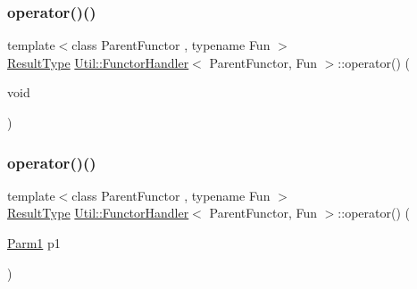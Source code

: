 \mbox{\label{classUtil_1_1FunctorHandler_a568e55043d17f0034572b4ad2772391e}} 
\subsubsection{\texorpdfstring{operator()()}{operator()()}\hspace{0.1cm}{\footnotesize\ttfamily [2/12]}}
{\footnotesize\ttfamily template$<$class Parent\+Functor , typename Fun $>$ \\
\mbox{\hyperlink{classUtil_1_1FunctorHandler_a036da44b8cc2567704cebd2a20d16c80}{Result\+Type}} \mbox{\hyperlink{classUtil_1_1FunctorHandler}{Util\+::\+Functor\+Handler}}$<$ Parent\+Functor, Fun $>$\+::operator() (\begin{DoxyParamCaption}\item[{void}]{ }\end{DoxyParamCaption})\hspace{0.3cm}{\ttfamily [inline]}}

\mbox{\label{classUtil_1_1FunctorHandler_a38485a110bfa7b2fdb5e34553d2f7264}} 
\subsubsection{\texorpdfstring{operator()()}{operator()()}\hspace{0.1cm}{\footnotesize\ttfamily [3/12]}}
{\footnotesize\ttfamily template$<$class Parent\+Functor , typename Fun $>$ \\
\mbox{\hyperlink{classUtil_1_1FunctorHandler_a036da44b8cc2567704cebd2a20d16c80}{Result\+Type}} \mbox{\hyperlink{classUtil_1_1FunctorHandler}{Util\+::\+Functor\+Handler}}$<$ Parent\+Functor, Fun $>$\+::operator() (\begin{DoxyParamCaption}\item[{\mbox{\hyperlink{classUtil_1_1FunctorHandler_a0a902ba40a0ab746f1c29a81d68ae0db}{Parm1}}}]{p1 }\end{DoxyParamCaption})\hspace{0.3cm}{\ttfamily [inline]}}

